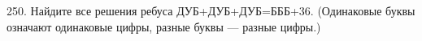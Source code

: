 250. Найдите все решения ребуса ДУБ+ДУБ+ДУБ=БББ+36. (Одинаковые буквы означают одинаковые цифры, разные буквы --- разные цифры.)\\
